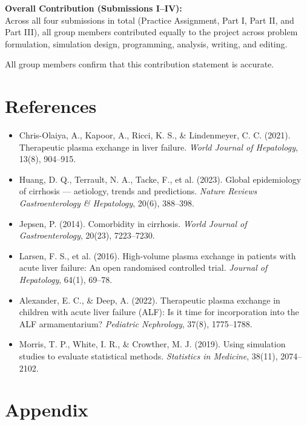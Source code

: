 \documentclass[10pt,a4paper]{article}
\begin{document}
\textbf{Overall Contribution (Submissions I--IV):}\\
Across all four submissions in total (Practice Assignment, Part I, Part II, and Part III), all group members contributed equally to the project across problem formulation, simulation design, programming, analysis, writing, and editing.

All group members confirm that this contribution statement is accurate.

\section*{References}
\begin{itemize}[leftmargin=1.2em,itemsep=2pt]\small
\item Chris-Olaiya, A., Kapoor, A., Ricci, K. S., \& Lindenmeyer, C. C. (2021). Therapeutic plasma exchange in liver failure. \emph{World Journal of Hepatology}, 13(8), 904--915.
\item Huang, D. Q., Terrault, N. A., Tacke, F., et al. (2023). Global epidemiology of cirrhosis --- aetiology, trends and predictions. \emph{Nature Reviews Gastroenterology \& Hepatology}, 20(6), 388--398.
\item Jepsen, P. (2014). Comorbidity in cirrhosis. \emph{World Journal of Gastroenterology}, 20(23), 7223--7230.
\item Larsen, F. S., et al. (2016). High-volume plasma exchange in patients with acute liver failure: An open randomised controlled trial. \emph{Journal of Hepatology}, 64(1), 69--78.
\item Alexander, E. C., \& Deep, A. (2022). Therapeutic plasma exchange in children with acute liver failure (ALF): Is it time for incorporation into the ALF armamentarium? \emph{Pediatric Nephrology}, 37(8), 1775--1788.
\item Morris, T. P., White, I. R., \& Crowther, M. J. (2019). Using simulation studies to evaluate statistical methods. \emph{Statistics in Medicine}, 38(11), 2074--2102.
\end{itemize}

\newpage
\section{Appendix}
\end{document}
